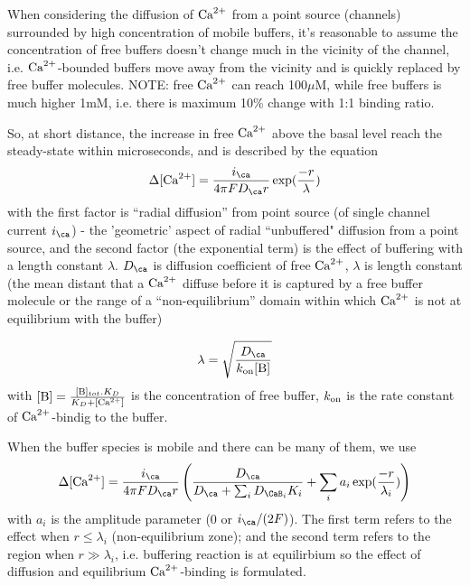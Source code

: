 When considering the diffusion of ${\text{Ca}^{2+}}$ from a point source (channels)
surrounded by high concentration of mobile buffers, it's reasonable to assume
the concentration of free buffers doesn't change much in the vicinity of the
channel, i.e. ${\text{Ca}^{2+}}$-bounded buffers move away from the vicinity and is quickly
replaced by free buffer molecules. NOTE: free ${\text{Ca}^{2+}}$ can reach 100$\mu$M, while
free buffers is much higher 1mM, i.e. there is maximum 10\% change with 1:1
binding ratio.

So, at short distance, the increase in free ${\text{Ca}^{2+}}$ above the basal level reach
the steady-state within microseconds, and is described by the equation
\begin{equation}
\Delta [\Ca] = \frac{i_\ca}{4\pi F D_\ca r} \exp(\frac{-r}{\lambda})
\end{equation}
with the first factor is ``radial diffusion'' from point source (of single
channel current $i_\ca$) - the 'geometric' aspect of radial
``unbuffered" diffusion from a point source, and the second factor (the
exponential term) is the effect of buffering with a length constant $\lambda$.
$D_\ca$ is diffusion coefficient of free ${\text{Ca}^{2+}}$, $\lambda$ is length constant
(the mean distant that a ${\text{Ca}^{2+}}$ diffuse before it is captured by a free buffer
molecule or the range of a ``non-equilibrium'' domain within which ${\text{Ca}^{2+}}$ is not
at equilibrium with the buffer)

\begin{equation}
\lambda = \sqrt{\frac{D_\ca}{k_\on [\B]}}
\end{equation}
with $[{\text{B}}]=\frac{[{\text{B}}]_{tot}.K_D}{K_D+[{\text{Ca}^{2+}}]}$ is the concentration of free
buffer, $k_{\text{on}}$ is the rate constant of ${\text{Ca}^{2+}}$-bindig to the buffer.

When the buffer species is mobile and there can be many of them, we use
\citep{naraghi1997} 
\begin{equation}
\label{eq:dCa}
\Delta[\Ca] = \frac{i_\ca}{4\pi F D_\ca r}\left( \frac{D_\ca}{D_\ca+\sum_i
D_{\CaB_i}K_i} + \sum_i a_i \exp(\frac{-r}{\lambda_i}) \right)
\end{equation}
with $a_i$ is the amplitude parameter (0 or $i_\ca/(2F)$). The first term refers
to the effect when $r \le \lambda_i$ (non-equilibrium zone); and the second term
refers to the region when $r \gg \lambda_i$, i.e. buffering reaction is at
equilirbium so the effect of diffusion and equilibrium ${\text{Ca}^{2+}}$-binding is
formulated. 

